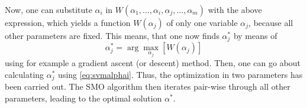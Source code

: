 \documentclass[a4paper,11pt]{article}
\numberwithin{equation}{section}
\begin{document}
{\begin{figure}[h]
	\label{fig:posslines}
\end{figure}
Now, one can substitute $\alpha_i$ in $W(\alpha_1,\dots, \alpha_i,\alpha_j,\dots,\alpha_m)$ with the above expression, which yields a function $W(\alpha_j)$ of only one variable $\alpha_j$, because all other parameters are fixed. This means, that one now finds $\alpha_j^*$ by means of \begin{equation}
\alpha_j^* = \arg\max_{\alpha_j} \left[W(\alpha_j)\right]
\end{equation} using for example a gradient ascent (or descent) method. Then, one can go about calculating $\alpha_j^*$ using \cref{eq:svmalphai}. Thus, the optimization in two parameters has been carried out. The SMO algorithm then iterates pair-wise through all other parameters, leading to the optimal solution $\alpha^*$.
}
\end{document}
